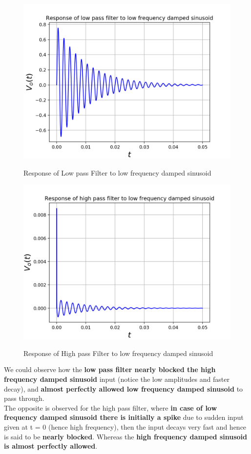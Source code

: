 \documentclass[11pt, a4paper]{article}
\begin{document}
\begin{figure}[H]
   	\centering
   	\includegraphics[scale=0.5]{lpf_low.png}
   	\label{fig:lpf_low}
   	\caption{Response of Low pass Filter to low frequency damped sinusoid}
\end{figure}
\begin{figure}[H]
   	\centering
   	\includegraphics[scale=0.5]{hpf_low.png}
   	\label{fig:hpf_low}
   	\caption{Response of High pass Filter to low frequency damped sinusoid}
\end{figure}
{
We could observe how the \textbf{low pass filter nearly blocked the high frequency damped sinusoid} input (notice the low amplitudes and faster decay), and \textbf{almost perfectly allowed low frequency damped sinusoid} to pass through.
\\The opposite is observed for the high pass filter, where \textbf{in case of low frequency damped sinusoid there is initially a spike} due to sudden input given at t = 0 (hence high frequency), then the input decays very fast and hence is said to be \textbf{nearly blocked}. Whereas the \textbf{high frequency damped sinusoid is almost perfectly allowed}.
}
\end{document}
